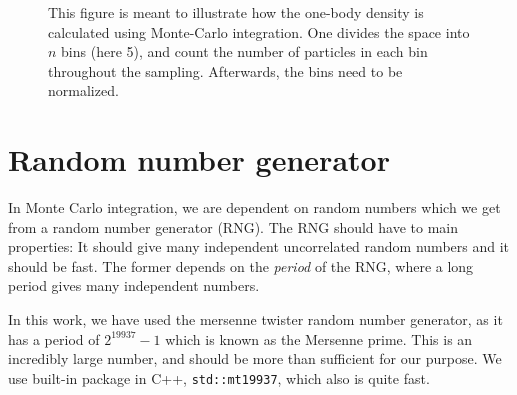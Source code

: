 \begin{figure}[H]
	\centering
	
	\caption{This figure is meant to illustrate how the one-body density is calculated using Monte-Carlo integration. One divides the space into $n$ bins (here 5), and count the number of particles in each bin throughout the sampling. Afterwards, the bins need to be normalized.}
	\label{fig:onebody}
\end{figure}

\section{Random number generator}
In Monte Carlo integration, we are dependent on random numbers which we get from a random number generator (RNG). The RNG should have to main properties: It should give many independent uncorrelated random numbers and it should be fast. The former depends on the \textit{period} of the RNG, where a long period gives many independent numbers. 

In this work, we have used the mersenne twister random number generator, as it has a period of $2^{19937}-1$ which is known as the Mersenne prime. This is an incredibly large number, and should be more than sufficient for our purpose. We use built-in package in C++, \lstinline|std::mt19937|, which also is quite fast.